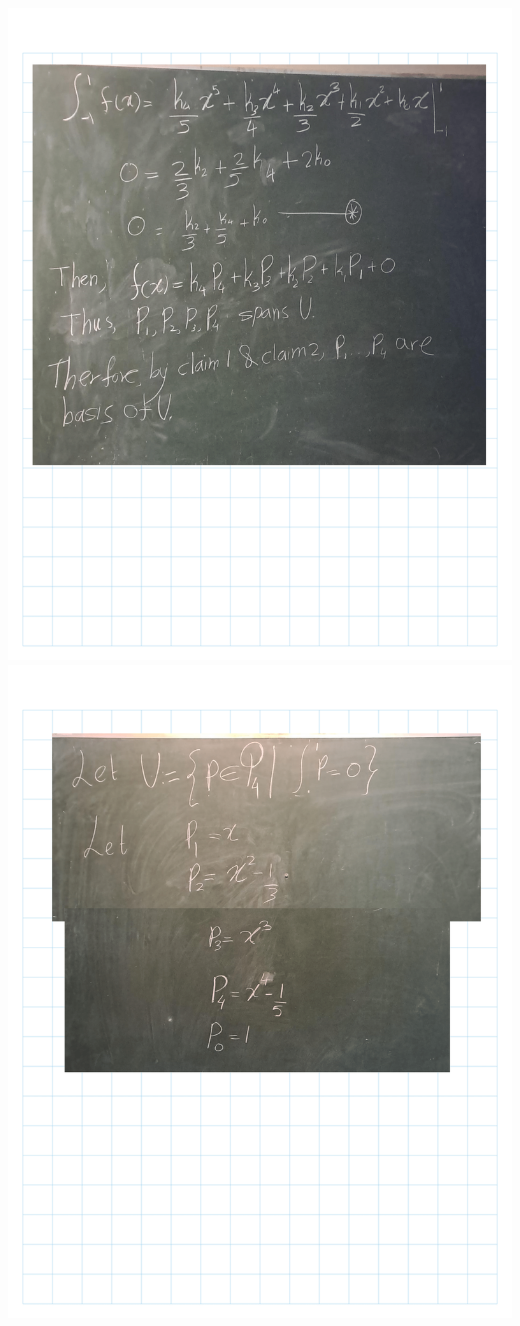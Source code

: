 \documentclass[
]{book}
\theoremstyle{definition}
\theoremstyle{definition}
\theoremstyle{definition}
\theoremstyle{definition}
\theoremstyle{remark}
\begin{document}
\includegraphics{fig/Ex 2B and 2C/Ex 2c (32).png}
\includegraphics{fig/Ex 2B and 2C/Ex 2c (33).png}
\end{document}

